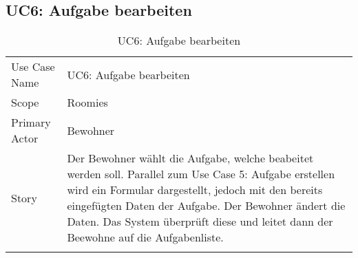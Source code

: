 \subsection{UC6: Aufgabe bearbeiten}
\begin{table}[H]
	\tablestyle
	\tablealtcolored
	\begin{tabularx}{\textwidth}{lX}
		\tablebody
			Use Case Name &
			UC6: Aufgabe bearbeiten
			\tabularnewline
			Scope &
			Roomies
			\tabularnewline
			Primary Actor &
			Bewohner
			\tabularnewline
			Story &
			Der Bewohner wählt die Aufgabe, welche beabeitet werden soll. Parallel zum Use Case 5: Aufgabe erstellen wird ein Formular dargestellt, jedoch mit den bereits eingefügten Daten der Aufgabe. Der Bewohner ändert die Daten. Das System überprüft diese und leitet dann der Beewohne auf die Aufgabenliste.
			\tabularnewline
		\tableend
	\end{tabularx}
	\caption{UC6: Aufgabe bearbeiten}
\end{table}


